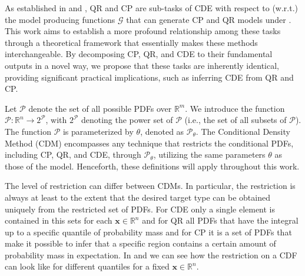 As established in  and , QR and CP are sub-tasks of CDE with respect to (w.r.t.) the model producing functions $\mathcal{G}$ that can generate CP and QR models under . This work aims to establish a more profound relationship among these tasks through a theoretical framework that essentially makes these methods interchangeable. By decomposing CP, QR, and CDE to their fundamental outputs in a novel way, we propose that these tasks are inherently identical, providing significant practical implications, such as inferring CDE from QR and CP.\@

Let $\mathcal{P}$ denote the set of all possible PDFs over $\mathbb{R}^m$. We introduce the function $\mathscr{P}: \mathbb{R}^n \rightarrow 2^{\mathcal{P}}$, with $2^{\mathcal{P}}$ denoting the power set of $\mathcal{P}$ (i.e., the set of all subsets of $\mathcal{P}$). The function $\mathscr{P}$ is parameterized by $\theta$, denoted as $\mathscr{P}_\theta$. The Conditional Density Method (CDM) encompasses any technique that restricts the conditional PDFs, including CP, QR, and CDE, through $\mathscr{P}_\theta$, utilizing the same parameters $\theta$ as those of the model. Henceforth, these definitions will apply throughout this work.

The level of restriction can differ between CDMs. In particular, the restriction is always at least to the extent that the desired target type can be obtained uniquely from the restricted set of PDFs. For CDE only a single element is contained in this sets for each $\mathbf{x} \in \mathbb{R}^n$ and for QR all PDFs that have the integral up to a specific quantile of probability mass and for CP it is a set of PDFs that make it possible to infer that a specific region contains a certain amount of probability mass in expectation. In  and  we can see how the restriction on a CDF can look like for different quantiles for a fixed $\mathbf{x} \in \mathbb{R}^n$.

